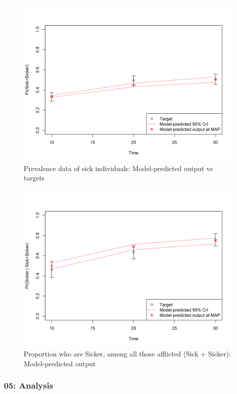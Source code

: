 \documentclass[]{article}
\begin{document}
\begin{figure}
\centering
\includegraphics{../figs/04_posterior-vs-targets-prevalence.png}
\caption{Prevalence data of sick individuals: Model-predicted output vs
targets \label{fig:04_p}}
\end{figure}

\begin{figure}
\centering
\includegraphics{../figs/04_posterior-vs-targets-proportion-sicker.png}
\caption{Proportion who are Sicker, among all those afflicted (Sick +
Sicker): Model-predicted output \label{fig:04_proportion}}
\end{figure}

\subsubsection{05: Analysis}\label{analysis}
\end{document}
